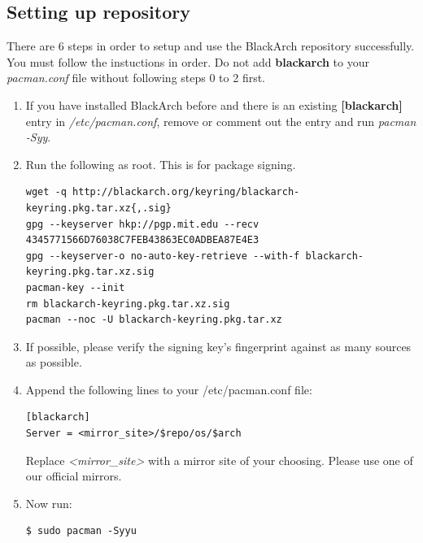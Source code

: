 \documentclass[a4paper, oneside, 11pt]{book}
\begin{document}
\subsection{Setting up repository}
There are 6 steps in order to setup and use the BlackArch repository
successfully. You must follow the instuctions in order. Do not add
\textbf{blackarch} to your \textit{pacman.conf} file without following steps 0
to 2 first.
\begin{enumerate}
\item If you have installed BlackArch before and there is an existing
\textbf{[blackarch]} entry in \textit{/etc/pacman.conf}, remove or comment out
the entry and run \textit{pacman -Syy}.
\item Run the following as root. This is for package signing.
{\small
\color{gray}
\begin{verbatim}
wget -q http://blackarch.org/keyring/blackarch-keyring.pkg.tar.xz{,.sig}
gpg --keyserver hkp://pgp.mit.edu --recv 4345771566D76038C7FEB43863EC0ADBEA87E4E3
gpg --keyserver-o no-auto-key-retrieve --with-f blackarch-keyring.pkg.tar.xz.sig
pacman-key --init
rm blackarch-keyring.pkg.tar.xz.sig
pacman --noc -U blackarch-keyring.pkg.tar.xz
\end{verbatim}
}
\item If possible, please verify the signing key's fingerprint against as many
sources as possible.
\item Append the following lines to your /etc/pacman.conf file:
{\small
\color{gray}
\begin{verbatim}
[blackarch]
Server = <mirror_site>/$repo/os/$arch
\end{verbatim}
}
Replace \textit{\textless mirror\_site\textgreater} with a mirror site of your
choosing. Please use one of our official mirrors.
\item Now run:
{\small
\color{gray}
\begin{verbatim}
$ sudo pacman -Syyu
\end{verbatim}
}
\end{enumerate}
\end{document}
